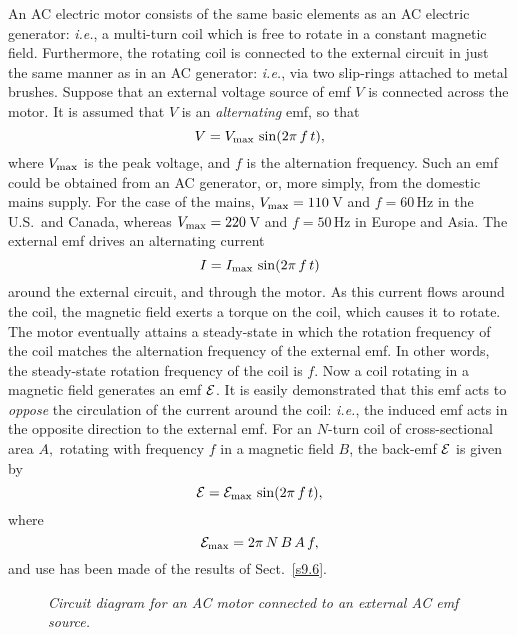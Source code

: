 An AC electric motor consists of the same basic elements as an
AC electric generator: {\em i.e.}, a multi-turn coil which is free
to rotate in a constant magnetic field. 
Furthermore, the rotating coil is connected to the
external circuit in just the same manner as in an AC generator: {\em i.e.}, via two
slip-rings attached to metal brushes. Suppose that an external voltage
source of emf $V$ is connected across the motor. It is assumed that $V$
is an {\em alternating}\/ emf, so that
\begin{equation}
V = V_{\rm max} \,\sin (2\pi\, f\, t),
\end{equation}
where $V_{\rm max}$ is the peak voltage, and $f$ is the alternation frequency. 
Such an emf could be obtained from an AC generator, or, more simply, from
the domestic mains supply. For the case of the mains, $V_{\rm max} = 110$\,V
and $f=60$\,Hz in the U.S.\ and Canada, whereas $V_{\rm max} = 220$\,V and
$f=50$\,Hz in Europe and Asia. The external emf drives an alternating current
\begin{equation}
I = I_{\rm max} \, \sin (2\pi\, f\, t)
\end{equation}
around the external circuit, and through the motor. As this current flows around the
coil, the magnetic field exerts a torque on the coil, which causes it
to rotate. The motor eventually  attains a steady-state in which
the rotation frequency of the coil matches the alternation frequency of the
external emf. In other words, the steady-state rotation frequency of the coil is
$f$. Now a coil rotating in a magnetic field generates an emf ${\cal E}$. 
It is easily demonstrated that this emf acts to {\em oppose}\/ the circulation of the
current around the coil: {\em i.e.}, the induced emf acts in the opposite
direction to the external emf. For an $N$-turn  coil of cross-sectional area $A,$
rotating with frequency $f$ in a magnetic field $B$, the back-emf ${\cal E}$
is given by
\begin{equation}
{\cal E} = {\cal E}_{\rm max}\,\sin (2\pi\, f\, t),
\end{equation}
where
\begin{equation}\label{e9.32}
{\cal E}_{\rm max} = 2\pi\,N\,B\,A\,f,
\end{equation}
 and use has been made of the results
of Sect.~\ref{s9.6}. 

\begin{figure}
\epsfysize=3in
\centerline{}
\caption{\em Circuit diagram for an AC motor connected to an external
AC emf source.}\label{f9.10}
\end{figure}

